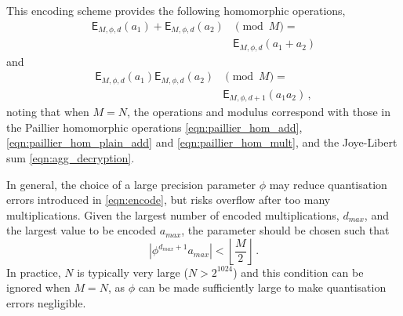 This encoding scheme provides the following homomorphic operations,
\begin{equation}
    \begin{split}
        \mathsf{E}_{M,\phi,d}(a_1) + \mathsf{E}_{M,\phi,d}(a_2)& \pmod{M} =\\
        &\mathsf{E}_{M,\phi,d}(a_1+a_2)
    \end{split}\label{eqn:encoding_homomorphic_add}
\end{equation}
and
\begin{equation}
    \begin{split}
        \mathsf{E}_{M,\phi,d}(a_1)\mathsf{E}_{M,\phi,d}(a_2)& \pmod{M} =\\
        &\mathsf{E}_{M,\phi,d+1}(a_1a_2)\,,
    \end{split}
\end{equation}
noting that when $M=N$, the operations and modulus correspond with those in the Paillier homomorphic operations \eqref{eqn:paillier_hom_add}, \eqref{eqn:paillier_hom_plain_add} and \eqref{eqn:paillier_hom_mult}, and the Joye-Libert sum \eqref{eqn:agg_decryption}.

In general, the choice of a large precision parameter $\phi$ may reduce quantisation errors introduced in \eqref{eqn:encode}, but risks overflow after too many multiplications. Given the largest number of encoded multiplications, $d_{max}$, and the largest value to be encoded $a_{max}$, the parameter should be chosen such that
\begin{equation}
    \left|\phi^{d_{max}+1}a_{max}\right| < \left\lfloor \frac{M}{2} \right\rfloor\,.
\end{equation}
In practice, $N$ is typically very large ($N>2^{1024}$) and this condition can be ignored when $M=N$, as $\phi$ can be made sufficiently large to make quantisation errors negligible.